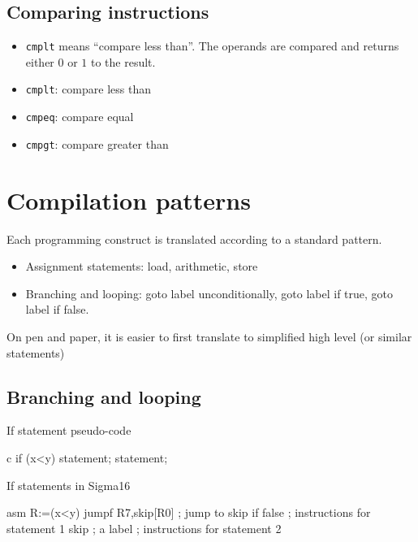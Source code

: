 \subsection{Comparing instructions}\label{sub:comparing_instructions}

\begin{itemize}
    \item \texttt{cmplt} means ``compare less than''.
          The operands are compared and returns either \(0\) or \(1\) to the result.
    \item \texttt{cmplt}: compare less than
    \item \texttt{cmpeq}: compare equal
    \item \texttt{cmpgt}: compare greater than
\end{itemize}

\section{Compilation patterns}\label{sec:compilation_patterns}

Each programming construct is translated according to a standard pattern.

\begin{itemize}
    \item Assignment statements: load, arithmetic, store
    \item Branching and looping: goto label unconditionally, goto label if true, goto label if false.
\end{itemize}
On pen and paper, it is easier to first translate to simplified high level (or similar statements)

\subsection{Branching and looping}\label{sub:branching_and_looping}

\begin{highlight}{If statement pseudo-code}
    \begin{code}{c}
        if (x<y) {
            statement;
        }
        statement;
    \end{code}
\end{highlight}

\begin{highlight}{If statements in Sigma16}
    \begin{code}{asm}
        R:=(x<y)
        jumpf R7,skip[R0] ; jump to skip if false
        ; instructions for statement 1
        skip ; a label
        ; instructions for statement 2
    \end{code}
\end{highlight}

